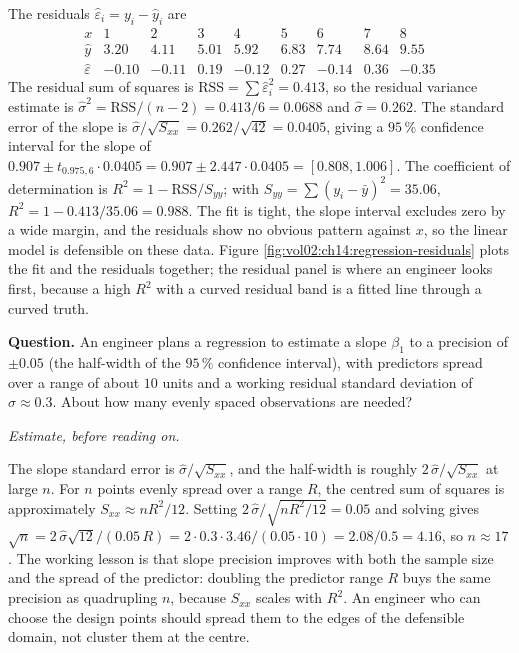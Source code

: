 The residuals $\hat{\varepsilon}_{i} = y_{i} - \hat{y}_{i}$ are
\[
\begin{array}{c|cccccccc}
x & 1 & 2 & 3 & 4 & 5 & 6 & 7 & 8 \\ \hline
\hat{y} & 3.20 & 4.11 & 5.01 & 5.92 & 6.83 & 7.74 & 8.64 & 9.55 \\
\hat{\varepsilon} & -0.10 & -0.11 & 0.19 & -0.12 & 0.27 & -0.14 & 0.36 & -0.35
\end{array}
\]
The residual sum of squares is $\mathrm{RSS} = \sum
\hat{\varepsilon}_{i}^{2} = 0.413$, so the residual variance
estimate is $\hat{\sigma}^{2} = \mathrm{RSS}/(n - 2) = 0.413/6 =
0.0688$ and $\hat{\sigma} = 0.262$. The standard error of the slope
is $\hat{\sigma}/\sqrt{S_{xx}} = 0.262/\sqrt{42} = 0.0405$, giving
a $95\,\%$ confidence interval for the slope of $0.907 \pm
t_{0.975, 6} \cdot 0.0405 = 0.907 \pm 2.447 \cdot 0.0405 =
[0.808, 1.006]$. The coefficient of determination is $R^{2} = 1 -
\mathrm{RSS}/S_{yy}$; with $S_{yy} = \sum(y_{i} - \bar{y})^{2} =
35.06$, $R^{2} = 1 - 0.413/35.06 = 0.988$. The fit is tight, the
slope interval excludes zero by a wide margin, and the residuals
show no obvious pattern against $x$, so the linear model is
defensible on these data. Figure
\ref{fig:vol02:ch14:regression-residuals} plots the fit and the
residuals together; the residual panel is where an engineer looks
first, because a high $R^{2}$ with a curved residual band is a
fitted line through a curved truth.



\begin{estimation}
\textbf{Question.} An engineer plans a regression to estimate a
slope $\beta_{1}$ to a precision of $\pm 0.05$ (the half-width of
the $95\,\%$ confidence interval), with predictors spread over a
range of about $10$ units and a working residual standard deviation
of $\hat{\sigma} \approx 0.3$. About how many evenly spaced
observations are needed?

\smallskip
\textit{Estimate, before reading on.}

\smallskip
The slope standard error is $\hat{\sigma}/\sqrt{S_{xx}}$, and the
half-width is roughly $2\,\hat{\sigma}/\sqrt{S_{xx}}$ at large $n$.
For $n$ points evenly spread over a range $R$, the centred sum of
squares is approximately $S_{xx} \approx n R^{2}/12$. Setting
$2\,\hat{\sigma}/\sqrt{nR^{2}/12} = 0.05$ and solving gives
$\sqrt{n} = 2\,\hat{\sigma}\sqrt{12}/(0.05\,R) = 2 \cdot 0.3 \cdot
3.46/(0.05 \cdot 10) = 2.08/0.5 = 4.16$, so $n \approx 17$. The
working lesson is that slope precision improves with both the
sample size and the spread of the predictor: doubling the predictor
range $R$ buys the same precision as quadrupling $n$, because
$S_{xx}$ scales with $R^{2}$. An engineer who can choose the design
points should spread them to the edges of the defensible domain,
not cluster them at the centre.
\end{estimation}

